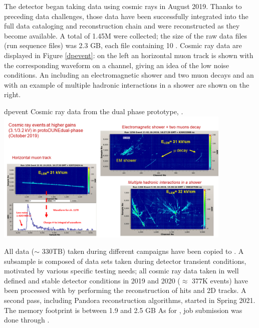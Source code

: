 \documentclass[../main-v1.tex]{subfiles}
\begin{document}
The  detector began taking data using cosmic rays in August 2019. Thanks to preceding data challenges, those data have been successfully integrated into the full data cataloging and reconstruction chain and were   reconstructed as they become available.
A total of 1.45M  were collected; the size of the raw data files (run sequence files) was 2.3 GB, each file containing 10 . Cosmic ray data are displayed in Figure \ref{dpevent}: on
the left an horizontal muon track is shown with the corresponding waveform on a channel, giving an
idea of the low noise conditions. An  including an electromagnetic shower and two muon decays
and an  with an example of multiple hadronic interactions in a shower are shown on the right.


 
\begin{dunefigure}
{dpevent} %
{Cosmic ray data from the dual phase prototype, .}
\includegraphics[width=0.85\textwidth]{graphics/IntroFigures/Fig_09_protodune-dp-event.png}
\end{dunefigure}


All data ($\sim$ 330TB) taken during different campaigns   have been copied to . A subsample is composed of data sets taken during detector transient conditions, motivated by various specific testing needs;  all cosmic ray data taken in well defined and stable detector conditions in 2019 and 2020 ($\approx$  377K events) have been processed with  by performing the reconstruction of hits and 2D tracks. A second pass, including Pandora reconstruction algorithms, started in Spring 2021. 
The memory footprint is between 1.9 and 2.5 GB
As for , job submission was done through .
\end{document}
